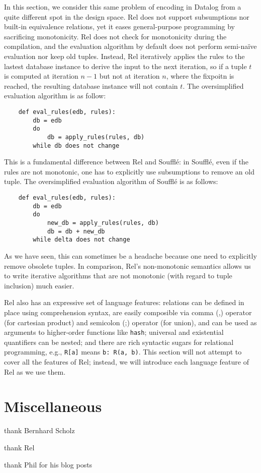 In this section, we consider this same problem of encoding \egraphs in Datalog
 from a quite different spot in the design space.
Rel does not support subsumptions nor built-in equivalence relations,
 yet it eases general-purpose programming by sacrificing monotonicity.
Rel does not check for monotonicity during the compilation, 
 and the evaluation algorithm by default does not perform semi-na\"ive evaluation
 nor keep old tuples.
Instead, Rel iteratively applies the rules to the lastest database instance 
 to derive the input to the next iteration, 
 so if a tuple $t$ is computed at iteration $n-1$ but not at iteration $n$, 
 where the fixpoitn is reached, the resulting database instance will not contain $t$.
The oversimplified evaluation algorithm is as follow:
\begin{verbatim}
    def eval_rules(edb, rules):
        db = edb
        do
            db = apply_rules(rules, db)
        while db does not change
\end{verbatim}
This is a fundamental difference between Rel and Souffl\'e:
 in Souffl\'e, even if the rules are not monotonic,
 one has to explicitly use subsumptions to remove an old tuple.
The oversimplified evaluation algorithm of Souffl\'e is as follows:
\begin{verbatim}
    def eval_rules(edb, rules):
        db = edb
        do
            new_db = apply_rules(rules, db)
            db = db + new_db
        while delta does not change
\end{verbatim}
As we have seen, this can sometimes be a headache 
 because one need to explicitly remove obsolete tuples.
In comparison,
 Rel's non-monotonic semantics allows us to write iterative algorithms that are
 not monotonic (with regard to tuple inclusion) much easier.

Rel also has an expressive set of language features:
 relations can be defined in place using comprehension syntax,
 are easily composible via comma (,) operator (for cartesian product) 
 and semicolon (;) operator (for union),
 and can be used as arguments to higher-order functions like \verb|hash|;
 universal and existential quantifiers can be nested;
 and there are rich syntactic sugars for relational programming, e.g.,
 \verb|R[a]| means \verb|b: R(a, b)|.
This section will not attempt to cover all the features of Rel;
 instead, we will introduce each language feature of Rel as we use them.



\section{Miscellaneous}

thank Bernhard Scholz

thank Rel

thank Phil for his blog posts
